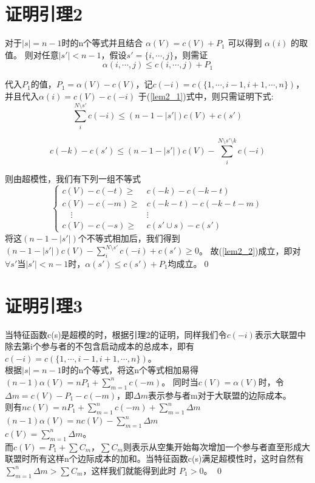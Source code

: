 \documentclass[UTF8]{article}
\begin{document}
\section*{证明引理2}
对于$\left| s \right|= n-1 $时的n个等式并且结合 $\alpha(V)=c(V)+P_1$ 可以得到 $\alpha(i)$ 的取值。
则对任意$\left| s' \right| < n-1$，假设$s'=\{i,\cdots,j\}$，则需证
\begin{equation} \label{lem2_1}
  \alpha(i,\cdots,j) \leq c(i,\cdots,j)+P_1
\end{equation}

代入$P_1$的值，$P_1=\alpha(V)-c(V)$，记$c(-i)=c(\{1,\cdots,i-1,i+1,\cdots,n\})$，并且代入$\alpha(i) = c(V)-c(-i)$ 于(\ref{lem2_1})式中，则只需证明下式:
\begin{equation}   \label{lem2_2}
  \sum_i^{N\setminus s'} c(-i) \leq (n-1-\left| s' \right|)c(V)+c(s')
\end{equation}

\Rightarrow \qquad

\begin{equation*}
  c(-k)-c(s') \leq (n-1-\left| s' \right|)c(V)-\sum_i^{N\setminus s'\setminus k} c(-i)
\end{equation*}

则由超模性，我们有下列一组不等式
\[
\begin{cases}
  c(V)-c(-t) \geq & c(-k)-c(-k-t) \\
  c(V)-c(-m) \geq & c(-k-t)-c(-k-t-m) \\
 \quad   \vdots        &\vdots\\
 c(V)-c(-s) \geq & c(s' \cup s)-c(s')
\end{cases}
\]
将这$(n-1-\left| s' \right|)$个不等式相加后，我们得到
$(n-1-\left| s' \right|)c(V)- \sum_i^{N\setminus s'} c(-i)+c(s') \geq 0 $。
故(\ref{lem2_2})成立，即对$\forall s'$当$\left|s' \right|<n-1$时，$\alpha(s') \leq c(s')+P_1$均成立。\qed

\section*{证明引理3}
当特征函数c(s)是超模的时，根据引理2的证明，同样我们令$c(-i)$表示大联盟中除去第i个参与者的不包含启动成本的总成本，即有$c(-i)=c(\{1,\cdots,i-1,i+1,\cdots,n\})$。\\
根据$\left| s \right|= n-1 $时的n个等式，将这n个等式相加易得$(n-1)\alpha(V)=nP_1+ \sum_{m=1}^n c(-m)$。
同时当$c(V)=\alpha(V)$时，令$\Delta m=c(V)-P_1-c(-m)$，即$\Delta m$表示参与者m对于大联盟的边际成本。\\
则有$nc(V)=nP_1+\sum_{m=1}^n c(-m) +\sum_{m=1}^n \Delta m$ \\
\Rightarrow  \qquad  $(n-1)\alpha(V)=nc(V)-\sum_{m=1}^n \Delta m$ \\
\Rightarrow   \qquad  $c(V)= \sum_{m=1}^n \Delta m$。 \\
而$c(V)=P_1+\sum C_m$，$\sum C_m $则表示从空集开始每次增加一个参与者直至形成大联盟时所有这样n个边际成本的加和。当特征函数c(s)满足超模性时，这时自然有$\sum_{m=1}^n \Delta m > \sum C_m$，这样我们就能得到此时 $P_1 > 0$。
\qed
\end{document}
